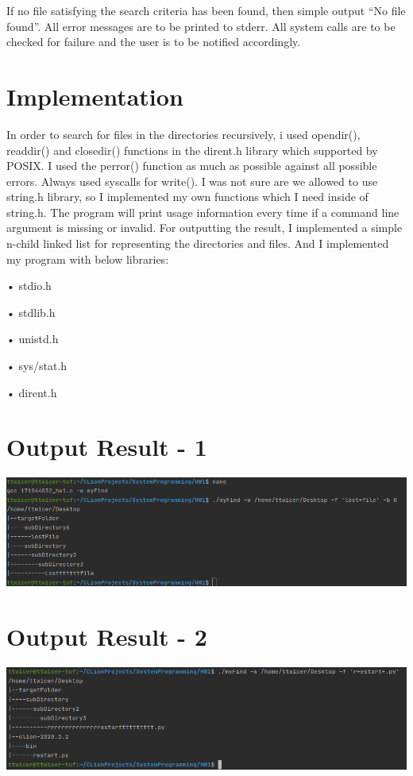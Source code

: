 \documentclass{article}
\begin{document}
If no file satisfying the search criteria has been found, then simple output “No file found”. All error
messages are to be printed to stderr. All system calls are to be checked for failure and the user is to
be notified accordingly.


\section*{Implementation}

In order to search for files in the directories recursively, i used opendir(), readdir() and closedir() functions in the dirent.h library which supported by POSIX. 
I used the perror() function as much as possible against all possible errors. Always used syscalls for write(). 
I was not sure are we allowed to use string.h library, so I implemented my own functions which I need inside of string.h. 
The program will print usage information every time if a command line argument is missing or invalid.
For outputting the result, I implemented a simple n-child linked list for representing the directories and files.
And I implemented my program with below libraries:

• stdio.h

• stdlib.h

• unistd.h

• sys/stat.h

• dirent.h


\section*{Output Result - 1}
\includegraphics[scale=0.49]{adsız.png}

\section*{Output Result - 2}
\includegraphics[scale=0.50]{adsız1.png}
\end{document}
